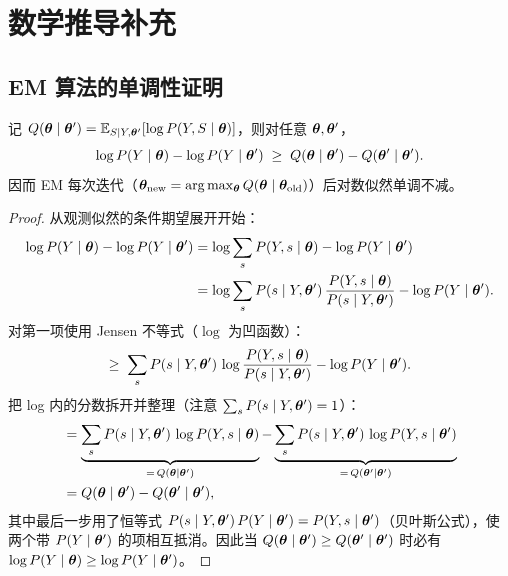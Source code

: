 
\section{数学推导补充}

\subsection{EM 算法的单调性证明}

\begin{proposition}[EM 的单调性]
记 $Q(\bm{\theta} \mid \bm{\theta}') = \mathbb{E}_{S \mid Y, \bm{\theta}'}[\log P(Y, S \mid \bm{\theta})]$，则对任意 $\bm{\theta}, \bm{\theta}'$，
\begin{equation}
\log P(Y \mid \bm{\theta}) - \log P(Y \mid \bm{\theta}') \;\ge\; Q(\bm{\theta} \mid \bm{\theta}') - Q(\bm{\theta}' \mid \bm{\theta}').
\end{equation}
因而 EM 每次迭代（$\bm{\theta}_{\text{new}} = \arg\max_{\bm{\theta}} Q(\bm{\theta} \mid \bm{\theta}_{\text{old}})$）后对数似然单调不减。
\end{proposition}

\begin{proof}
从观测似然的条件期望展开开始：
\begin{align}
\log P(Y \mid \bm{\theta}) - \log P(Y \mid \bm{\theta}')
&= \log \sum_{s} P(Y, s \mid \bm{\theta}) - \log P(Y \mid \bm{\theta}') \notag \\
&= \log \sum_{s} P(s \mid Y, \bm{\theta}')\, \frac{P(Y, s \mid \bm{\theta})}{P(s \mid Y, \bm{\theta}')} - \log P(Y \mid \bm{\theta}').
\end{align}
对第一项使用 Jensen 不等式（$\log$ 为凹函数）：
\begin{equation}
\ge\; \sum_{s} P(s \mid Y, \bm{\theta}')\, \log \frac{P(Y, s \mid \bm{\theta})}{P(s \mid Y, \bm{\theta}')} - \log P(Y \mid \bm{\theta}').
\end{equation}
把 log 内的分数拆开并整理（注意 $\sum_s P(s \mid Y, \bm{\theta}') = 1$）：
\begin{align}
&= \underbrace{\sum_{s} P(s \mid Y, \bm{\theta}')\, \log P(Y, s \mid \bm{\theta})}_{=\, Q(\bm{\theta} \mid \bm{\theta}')}
- \underbrace{\sum_{s} P(s \mid Y, \bm{\theta}')\, \log P(Y, s \mid \bm{\theta}')}_{=\, Q(\bm{\theta}' \mid \bm{\theta}')} \notag \\
&= Q(\bm{\theta} \mid \bm{\theta}') - Q(\bm{\theta}' \mid \bm{\theta}'),
\end{align}
其中最后一步用了恒等式 $P(s \mid Y, \bm{\theta}')\, P(Y \mid \bm{\theta}') = P(Y, s \mid \bm{\theta}')$（贝叶斯公式），使两个带 $P(Y \mid \bm{\theta}')$ 的项相互抵消。因此当 $Q(\bm{\theta} \mid \bm{\theta}') \ge Q(\bm{\theta}' \mid \bm{\theta}')$ 时必有 $\log P(Y \mid \bm{\theta}) \ge \log P(Y \mid \bm{\theta}')$。
\end{proof}

